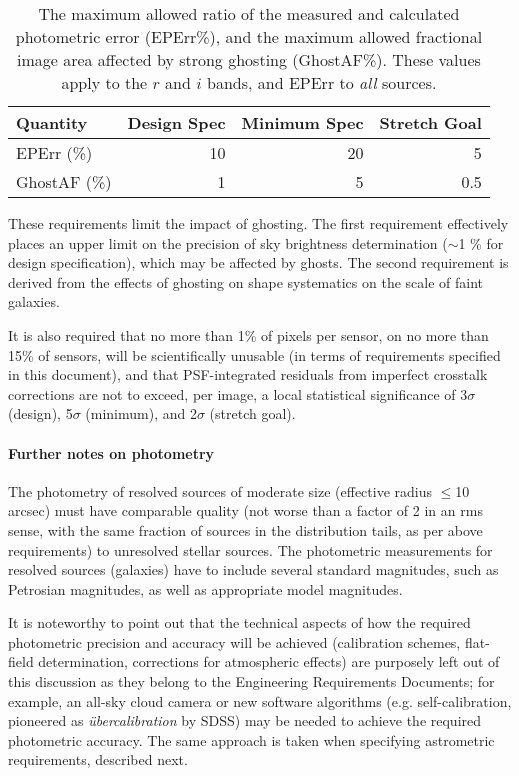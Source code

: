 \begin{table}[h]
\begin{tabular}{|l|r|r|r|}
\hline
Quantity   & Design Spec & Minimum Spec & Stretch Goal   \\
\hline
      EPErr  (\%)       &    10       &      20      &        5         \\
    GhostAF  (\%)       &     1       &       5      &      0.5         \\
\hline
\end{tabular}
\caption{The maximum allowed ratio of the measured and calculated photometric error
 (EPErr\%), and the maximum allowed fractional image area affected by strong ghosting
(GhostAF\%). These values apply to the $r$ and $i$ bands, and EPErr to {\it all}
sources.}
\label{ghosting}
\end{table}

These requirements limit the impact of ghosting. The first requirement effectively
places an upper limit on the precision of sky brightness determination
($\sim$1 \% for design specification), which may be affected by ghosts. The
second requirement is derived from the effects of ghosting on shape
systematics on the scale of faint galaxies.

It is also required that no more than 1\% of pixels per sensor, on no more than
15\% of sensors, will be scientifically unusable (in terms of requirements
specified in this document), and that PSF-integrated residuals from imperfect
crosstalk corrections are not to exceed, per image, a local statistical
significance of 3$\sigma$ (design), 5$\sigma$ (minimum), and 2$\sigma$
(stretch goal).


\paragraph{Further notes on photometry\\}


The photometry of resolved sources of moderate size (effective radius $\le$10
arcsec) must
have comparable quality (not worse than a factor of 2 in an rms sense, with the
same fraction of sources in the distribution tails, as per above requirements)
to unresolved stellar sources. The photometric measurements for resolved sources
(galaxies) have to include several standard magnitudes, such as Petrosian magnitudes,
as well as appropriate model magnitudes.

It is noteworthy to point out that the technical aspects of how the
required photometric precision and accuracy will be achieved (\eg calibration
schemes,
flat-field determination, corrections for atmospheric effects) are purposely
left out of this discussion as they belong to the Engineering Requirements
Documents; for example, an all-sky cloud camera or new software algorithms
(e.g. self-calibration, pioneered as {\it \"{u}bercalibration} by SDSS)
may be needed to achieve the required photometric accuracy. The same
approach is taken when specifying astrometric requirements, described next.



